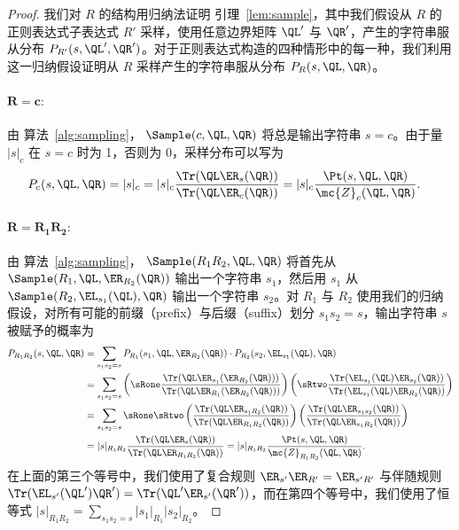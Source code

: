 \begin{proof}

我们对 $R$ 的结构用归纳法证明 引理~\ref{lem:sample}，其中我们假设从 $R$ 的正则表达式子表达式 $R'$ 采样，使用任意边界矩阵 $\QL'$ 与 $\QR'$，产生的字符串服从分布 $P_{R'}(s, \QL', \QR')$。对于正则表达式构造的四种情形中的每一种，我们利用这一归纳假设证明从 $R$ 采样产生的字符串服从分布 $P_R(s, \QL, \QR)$。

\paragraph{$\mathbf{R = c:}$} 由 算法~\ref{alg:sampling}，
$\Sample(c, \QL, \QR)$ 将总是输出字符串 $s = c$。由于量 $|s|_c$ 在 $s = c$ 时为 1，否则为 0，采样分布可以写为
%
\begin{align*}
    P_c(s, \QL, \QR) &= |s|_c = |s|_c \frac{\Tr(\QL \ER_s(\QR))}{\Tr(\QL \ER_c(\QR))} = |s|_c \frac{\Pt(s, \QL, \QR)}{\mc{Z}_c(\QL, \QR)}.
\end{align*}

\paragraph{$\mathbf{R = R_1 R_2:}$} 由 算法~\ref{alg:sampling}，
$\Sample(R_1 R_2, \QL, \QR)$ 将首先从 $\Sample(R_1, \QL, \ER_{R_2}(\QR))$ 输出一个字符串 $s_1$，然后用 $s_1$ 从 $\Sample(R_2, \EL_{s_1}(\QL), \QR)$ 输出一个字符串 $s_2$。对 $R_1$ 与 $R_2$ 使用我们的归纳假设，对所有可能的前缀（prefix）与后缀（suffix）划分 $s_1 s_2 = s$，输出字符串 $s$ 被赋予的概率为
%
\begin{align*}
    P_{R_1 R_2}(s, \QL, \QR) &= \sum_{s_1 s_2 = s} P_{R_1}(s_1, \QL, \ER_{R_2}(\QR)) \cdot P_{R_2}(s_2, \EL_{s_1}(\QL), \QR) \\
    &= \sum_{s_1 s_2 = s} \left( \sRone \frac{\Tr(\QL \ER_{s_1}(\ER_{R_2}(\QR)))}{\Tr(\QL \ER_{R_1}(\ER_{R_2}(\QR)))} \right) \left( \sRtwo \frac{\Tr(\EL_{s_1}(\QL) \ER_{s_2}(\QR))}{\Tr(\EL_{s_1}(\QL) \ER_{R_2}(\QR))} \right) \\
    &= \sum_{s_1 s_2 = s} \sRone \sRtwo \left(\frac{\Tr(\QL \ER_{s_1 R_2}(\QR))}{\Tr(\QL \ER_{R_1 R_2}(\QR))}\right) \left(\frac{\Tr(\QL \ER_{s_1 s_2}(\QR))}{\Tr(\QL \ER_{s_1 R_2}(\QR))}\right) \\
    &= |s|_{R_1 R_2} \frac{\Tr(\QL \ER_{s}(\QR))}{\Tr(\QL \ER_{R_1 R_2}(\QR))} = |s|_{R_1 R_2} \frac{\Pt(s, \QL, \QR)}{\mc{Z}_{R_1 R_2}(\QL, \QR)}.
\end{align*}
%
在上面的第三个等号中，我们使用了复合规则 $\ER_{s'}\ER_{R'} = \ER_{s' R'}$ 与伴随规则 $\Tr(\EL_{s'}(\QL') \QR') = \Tr(\QL' \ER_{s'}(\QR'))$，而在第四个等号中，我们使用了恒等式 $|s|_{R_1 R_2} = \sum_{s_1 s_2 = s} |s_1|_{R_1} |s_2|_{R_2}$。


\end{proof}

